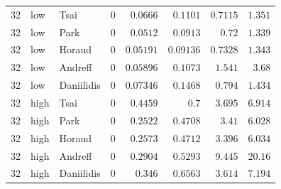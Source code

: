 \begin{longtable}{rllrrrrr}
32 & low & Tsai & 0 & $0.0666$ & $0.1101$ & $0.7115$ & $1.351$ \\
32 & low & Park & 0 & $0.0512$ & $0.0913$ & $0.72$ & $1.339$ \\
32 & low & Horaud & 0 & $0.05191$ & $0.09136$ & $0.7328$ & $1.343$ \\
32 & low & Andreff & 0 & $0.05896$ & $0.1073$ & $1.541$ & $3.68$ \\
32 & low & Daniilidis & 0 & $0.07346$ & $0.1468$ & $0.794$ & $1.434$ \\
32 & high & Tsai & 0 & $0.4459$ & $0.7$ & $3.695$ & $6.914$ \\
32 & high & Park & 0 & $0.2522$ & $0.4708$ & $3.41$ & $6.028$ \\
32 & high & Horaud & 0 & $0.2573$ & $0.4712$ & $3.396$ & $6.034$ \\
32 & high & Andreff & 0 & $0.2904$ & $0.5293$ & $9.445$ & $20.16$ \\
32 & high & Daniilidis & 0 & $0.346$ & $0.6563$ & $3.614$ & $7.194$ \\
\end{longtable}
\endgroup
